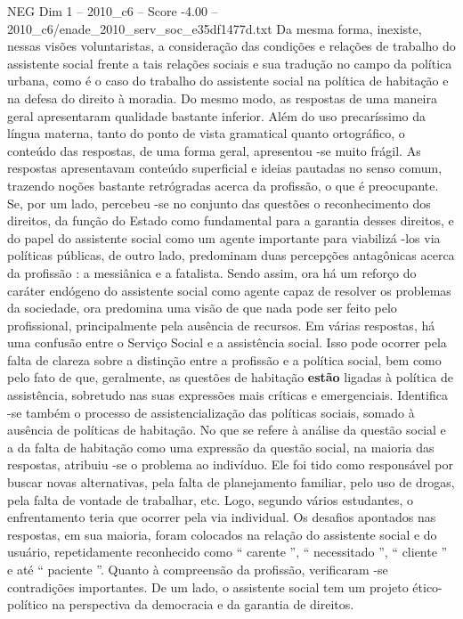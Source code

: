\begin{textsample}{NEG Dim 1 – 2010\_c6 – Score -4.00 – 2010\_c6/enade\_2010\_serv\_soc\_e35df1477d.txt}
Da mesma forma, inexiste, nessas visões voluntaristas, a consideração das condições e relações de trabalho do assistente social frente a tais relações sociais e sua tradução no campo da política urbana, como é o caso do trabalho do assistente social na política de habitação e na defesa do direito à moradia.
Do mesmo modo, as respostas de uma maneira geral apresentaram qualidade bastante inferior.
Além do uso precaríssimo da língua materna, tanto do ponto de vista gramatical quanto ortográfico, o conteúdo das respostas, de uma forma geral, apresentou -se muito frágil.
As respostas apresentavam conteúdo superficial e ideias pautadas no senso comum, trazendo noções bastante retrógradas acerca da profissão, o que é preocupante.
Se, por um lado, percebeu -se no conjunto das questões o reconhecimento dos direitos, da função do Estado como fundamental para a garantia desses direitos, e do papel do assistente social como um agente importante para viabilizá -los via políticas públicas, de outro lado, predominam duas percepções antagônicas acerca da profissão : a messiânica e a fatalista.
Sendo assim, ora há um reforço do caráter endógeno do assistente social como agente capaz de resolver os problemas da sociedade, ora predomina uma visão de que nada pode ser feito pelo profissional, principalmente pela ausência de recursos.
Em várias respostas, há uma confusão entre o Serviço Social e a assistência social.
Isso pode ocorrer pela falta de clareza sobre a distinção entre a profissão e a política social, bem como pelo fato de que, geralmente, as questões de habitação \textbf{estão} ligadas à política de assistência, sobretudo nas suas expressões mais críticas e emergenciais.
Identifica -se também o processo de assistencialização das políticas sociais, somado à ausência de políticas de habitação.
No que se refere à análise da questão social e a da falta de habitação como uma expressão da questão social, na maioria das respostas, atribuiu -se o problema ao indivíduo.
Ele foi tido como responsável por buscar novas alternativas, pela falta de planejamento familiar, pelo uso de drogas, pela falta de vontade de trabalhar, etc.
Logo, segundo vários estudantes, o enfrentamento teria que ocorrer pela via individual.
Os desafios apontados nas respostas, em sua maioria, foram colocados na relação do assistente social e do usuário, repetidamente reconhecido como “ carente ”, “ necessitado ”, “ cliente ” e até “ paciente ”.
Quanto à compreensão da profissão, verificaram -se contradições importantes.
De um lado, o assistente social tem um projeto ético-político na perspectiva da democracia e da garantia de direitos.

\end{textsample}

